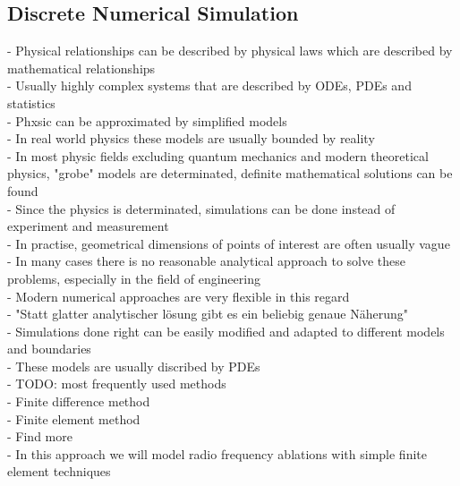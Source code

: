 \documentclass[parskip=half, titlepage=yes, 12pt, BCOR=12mm, DIV=calc]{scrartcl}
\begin{document}
\subsection{Discrete Numerical Simulation}
- Physical relationships can be described by physical laws which are described by mathematical relationships \\
- Usually highly complex systems that are described by ODEs, PDEs and statistics \\
- Phxsic can be approximated by simplified models \\
- In real world physics these models are usually bounded by reality \\
- In most physic fields excluding quantum mechanics and modern theoretical physics, "grobe" models are determinated, definite mathematical solutions can be found \\ 
- Since the physics is determinated, simulations can be done instead of experiment and measurement  \\
- In practise, geometrical dimensions of points of interest are often usually vague \\
- In many cases there is no reasonable analytical approach to solve these problems, especially in the field of engineering  \\
- Modern numerical approaches are very flexible in this regard \\
- "Statt glatter analytischer lösung gibt es ein beliebig genaue Näherung" \\ 
- Simulations done right can be easily modified and adapted to different models and boundaries \\
- These models are usually discribed by PDEs \\ 
- TODO: most frequently used methods \\

- Finite difference method \\
- Finite element method \\
- Find more \\
- In this approach we will model radio frequency ablations with simple finite element techniques \\
\end{document}
